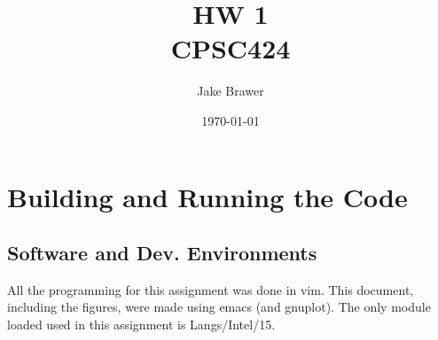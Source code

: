 \documentclass[11pt]{article}
\author{Jake Brawer}
\date{\today}
\title{HW 1\\\medskip
\large CPSC424}
\begin{document}
\maketitle

\section{Building and Running the Code}
\label{sec:orgd3dac10}

\subsection{Software and Dev. Environments}
\label{sec:org6d1c1e5}

All the programming for this assignment was done in vim. This document, including the figures, were made using emacs (and gnuplot). The only module loaded used in this assignment is Langs/Intel/15.
\end{document}
